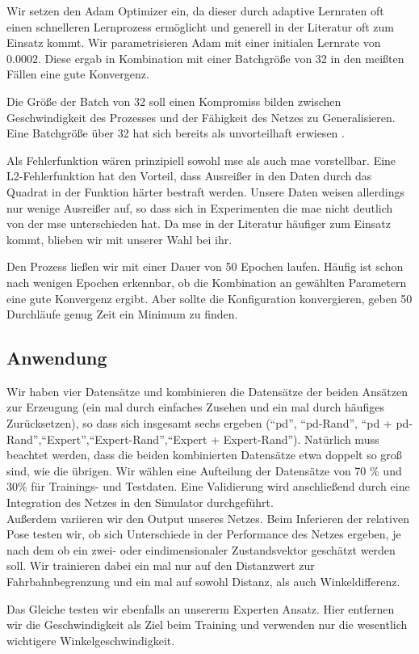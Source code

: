 Wir setzen den Adam Optimizer ein, da dieser durch adaptive Lernraten oft einen schnelleren Lernprozess ermöglicht und generell in der Literatur oft zum Einsatz kommt. Wir parametrisieren Adam mit einer initialen Lernrate von $0.0002$. Diese ergab in Kombination mit einer Batchgröße von 32 in den meißten Fällen eine gute Konvergenz.

Die Größe der Batch von 32 soll einen Kompromiss bilden zwischen Geschwindigkeit des Prozesses und der Fähigkeit des Netzes zu Generalisieren. Eine Batchgröße über 32 hat sich bereits als unvorteilhaft erwiesen \cite{keskar2017largebatch}.

Als Fehlerfunktion wären prinzipiell sowohl \acs{mse} als auch \acs{mae} vorstellbar. Eine L2-Fehlerfunktion hat den Vorteil, dass Ausreißer in den Daten durch das Quadrat in der Funktion härter bestraft werden. Unsere Daten weisen allerdings nur wenige Ausreißer auf, so dass sich in Experimenten die \acs{mae} nicht deutlich von der \acs{mse} unterschieden hat. Da \acs{mse} in der Literatur häufiger zum Einsatz kommt, blieben wir mit unserer Wahl bei ihr.

Den Prozess ließen wir mit einer Dauer von 50 Epochen laufen.  Häufig ist schon nach wenigen Epochen erkennbar, ob die Kombination an gewählten Parametern eine gute Konvergenz ergibt. Aber sollte die Konfiguration konvergieren, geben 50 Durchläufe genug Zeit ein Minimum zu finden.

\subsection{Anwendung}

Wir haben vier Datensätze und kombinieren die Datensätze der beiden Ansätzen zur Erzeugung (ein mal durch einfaches Zusehen und ein mal durch häufiges Zurücksetzen), so dass sich insgesamt sechs ergeben (``\acs{pd}'', ``\acs{pd}-Rand'', ``\acs{pd} + \acs{pd}-Rand'',``Expert'',``Expert-Rand'',``Expert + Expert-Rand''). Natürlich muss beachtet werden, dass die beiden kombinierten Datensätze etwa doppelt so groß sind, wie die übrigen. Wir wählen eine Aufteilung der Datensätze von 70 \% und 30\% für Trainings- und Testdaten. Eine Validierung wird anschließend durch eine Integration des Netzes in den Simulator durchgeführt.\\

Außerdem variieren wir den Output unseres Netzes. Beim Inferieren der relativen Pose testen wir, ob sich Unterschiede in der Performance des Netzes ergeben, je nach dem ob ein zwei- oder eindimensionaler Zustandsvektor geschätzt werden soll. Wir trainieren dabei ein mal nur auf den Distanzwert zur Fahrbahnbegrenzung und ein mal auf sowohl Distanz, als auch Winkeldifferenz.

Das Gleiche testen wir ebenfalls an unsererm Experten Ansatz. Hier entfernen wir die Geschwindigkeit als Ziel beim Training und verwenden nur die wesentlich wichtigere Winkelgeschwindigkeit.

